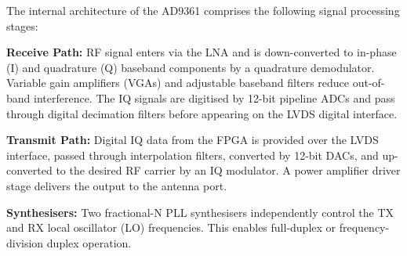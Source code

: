 \documentclass[12pt, a4paper, oneside]{report}
\begin{document}
The internal architecture of the AD9361 comprises the following signal processing stages:

\textbf{Receive Path:} RF signal enters via the LNA and is down-converted to in-phase (I) and quadrature (Q) baseband components by a quadrature demodulator. Variable gain amplifiers (VGAs) and adjustable baseband filters reduce out-of-band interference. The IQ signals are digitised by 12-bit pipeline ADCs and pass through digital decimation filters before appearing on the LVDS digital interface.

\textbf{Transmit Path:} Digital IQ data from the FPGA is provided over the LVDS interface, passed through interpolation filters, converted by 12-bit DACs, and up-converted to the desired RF carrier by an IQ modulator. A power amplifier driver stage delivers the output to the antenna port.

\textbf{Synthesisers:} Two fractional-N PLL synthesisers independently control the TX and RX local oscillator (LO) frequencies. This enables full-duplex or frequency-division duplex operation.
\end{document}
